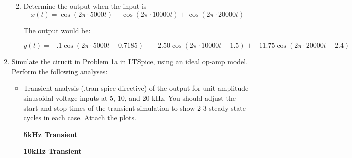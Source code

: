 \documentclass{article}
\begin{document}
\begin{enumerate}
\begin{enumerate}
\begin{center}
        \end{center}
        \item Determine the output when the input is
        \begin{equation}
            x(t) = \cos(2\pi\cdot5000t) + \cos(2\pi\cdot10000t)+\cos(2\pi\cdot20000t)
        \end{equation}
        \begin{center}
            The output would be:
        \end{center}
        \begin{equation}
            y(t) = -.1\cos(2\pi\cdot5000t- 0.7185) + -2.50\cos(2\pi\cdot10000t  - 1.5)+ -11.75\cos(2\pi\cdot20000t - 2.4)
        \end{equation}
    \end{enumerate}
    \newpage
    \item Simulate the cirucit in Problem 1a in LTSpice, using an ideal op-amp model. Perform the following analyses:
    \begin{itemize}
        \item Transient analysis (.tran spice directive) of the output for unit amplitude sinusoidal voltage inputs at 5, 10, and 20 kHz.  You should adjust the start and stop times of the transient simulation to show 2-3 steady-state cycles in each case.  Attach the plots.
        \begin{center}
            \textbf{5kHz Transient}
        \end{center}
        \begin{center}
            \textbf{10kHz Transient}
        \end{center}

\end{itemize}
\end{enumerate}
\end{document}
